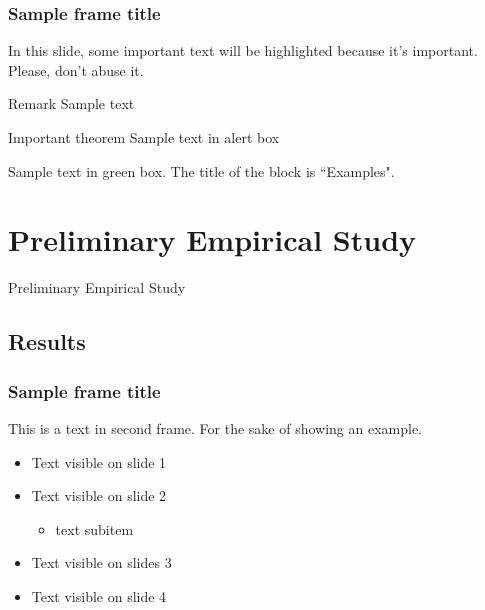 \documentclass[aspectratio=169,t,xcolor=table]{beamer}
\begin{document}
\begin{frame}
\frametitle{Sample frame title}

In this slide, some important text will be
\alert{highlighted} because it's important.
Please, don't abuse it.

\begin{block}{Remark}
Sample text
\end{block}

\begin{alertblock}{Important theorem}
Sample text in alert box
\end{alertblock}

\begin{examples}
Sample text in green box. The title of the block is ``Examples".
\end{examples}
\end{frame}




\section{Preliminary Empirical Study}

\begin{frame}{Preliminary Empirical Study}
\end{frame}




\subsection{Results}
\begin{frame}
\frametitle{Sample frame title}
This is a text in second frame. For the sake of showing an example.

\begin{itemize}
    \item<1-> Text visible on slide 1
    \item<2-> Text visible on slide 2
    \begin{itemize}
        \item text subitem
    \end{itemize}
    \item<3> Text visible on slides 3
    \item<4-> Text visible on slide 4
\end{itemize}
\end{frame}


\titlepage
\end{document}
